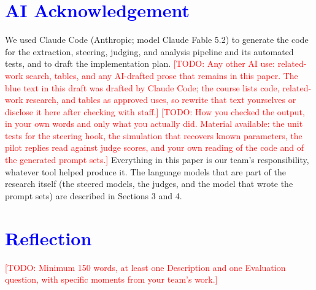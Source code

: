 \documentclass[11pt]{article}
\newcommand{\todo}[1]{\textcolor{red}{[TODO: #1]}}
\newcommand{\upd}[1]{{\color{blue}#1}}
\begin{document}
\section*{\textcolor{blue}{AI Acknowledgement}}
\upd{We used Claude Code (Anthropic; model Claude Fable 5.2) to generate the code
for the extraction, steering, judging, and analysis pipeline and its automated
tests, and to draft the implementation plan.}
\todo{Any other AI use: related-work search, tables, and any AI-drafted prose
that remains in this paper. The blue text in this draft was drafted by Claude
Code; the course lists code, related-work research, and tables as approved uses,
so rewrite that text yourselves or disclose it here after checking with staff.}
\todo{How you checked the output, in your own words and only what you actually
did. Material available: the unit tests for the steering hook, the simulation
that recovers known parameters, the pilot replies read against judge scores, and
your own reading of the code and of the generated prompt sets.}
\upd{Everything in this paper is our team's responsibility, whatever tool helped
produce it. The language models that are part of the research itself (the
steered models, the judges, and the model that wrote the prompt sets) are
described in Sections 3 and 4.}

\section*{\textcolor{blue}{Reflection}}
\todo{Minimum 150 words, at least one Description and one Evaluation question,
with specific moments from your team's work.}




\appendix
\end{document}
